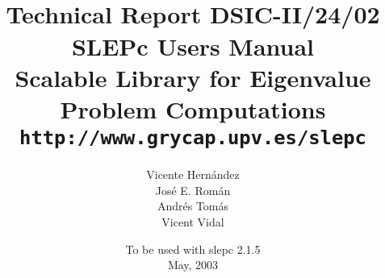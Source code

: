 \documentclass[titlepage,10pt,a4paper]{slepc}
\newcommand{\slepcversion}{2.1.5}
\newcommand{\packnoi}[1]{{\sc #1}\xspace}
\newcommand{\slepc}{\packnoi{slep\rm c}}
\newcommand{\slepchome}{http://www.grycap.upv.es/slepc}
\newcommand{\url}[1]{\texttt{#1}}
\begin{document}
\title{
 	\vspace*{-1cm}
	\\[2cm]
	\normalsize Technical Report DSIC-II/24/02
	\\[2cm]
	\vspace*{6mm}
	{\Large\bf\sffamily 
	SLEPc Users Manual\\[2mm]}
	{\large\bf\sffamily 
	Scalable Library for Eigenvalue Problem Computations}\\[2mm]
	\vspace*{6mm}
	\vspace*{6mm}
	\url{\slepchome}
	\\[6mm]
}

\author{
	Vicente Hern\'andez
	\\
	Jos\'e E. Rom\'an
	\\
	Andr\'es Tom\'as
	\\
	Vicent Vidal
	\\[2cm]
}

\date{
	To be used with \slepc \slepcversion\\
	May, 2003
}

{
\pagestyle{empty}
\maketitle
}

\setlength{\textheight}{14.99cm}
\setlength{\footskip}{2cm}
\setlength{\voffset}{2.3cm}

\pagestyle{empty}
\cleardoublepage
\end{document}

